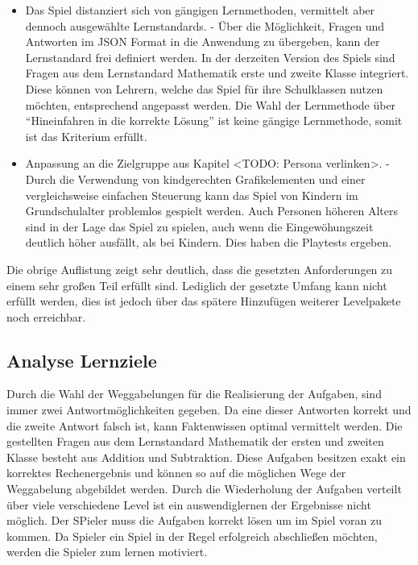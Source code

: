 \begin{itemize}
    \item{Das Spiel distanziert sich von gängigen Lernmethoden, vermittelt aber dennoch ausgewählte Lernstandards. - Über die Möglichkeit, Fragen und Antworten im JSON Format in die Anwendung zu übergeben, kann der Lernstandard frei definiert werden. In der derzeiten Version des Spiels sind Fragen aus dem Lernstandard Mathematik erste und zweite Klasse integriert. Diese können von Lehrern, welche das Spiel für ihre Schulklassen nutzen möchten, entsprechend angepasst werden. Die Wahl der Lernmethode über \enquote{Hineinfahren in die korrekte Lösung} ist keine gängige Lernmethode, somit ist das Kriterium erfüllt.}
    \item{Anpassung an die Zielgruppe aus Kapitel <TODO: Persona verlinken>. - Durch die Verwendung von kindgerechten Grafikelementen und einer vergleichsweise einfachen Steuerung kann das Spiel von Kindern im Grundschulalter problemlos gespielt werden. Auch Personen höheren Alters sind in der Lage das Spiel zu spielen, auch wenn die Eingewöhungszeit deutlich höher ausfällt, als bei Kindern. Dies haben die Playtests ergeben.}
\end{itemize}
Die obrige Auflistung zeigt sehr deutlich, dass die gesetzten Anforderungen zu einem sehr großen Teil erfüllt sind. Lediglich der gesetzte Umfang kann nicht erfüllt werden, dies ist jedoch über das spätere Hinzufügen weiterer Levelpakete noch erreichbar.

\subsection{Analyse Lernziele}
Durch die Wahl der Weggabelungen für die Realisierung der Aufgaben, sind immer zwei Antwortmöglichkeiten gegeben. Da eine dieser Antworten korrekt und die zweite Antwort falsch ist, kann Faktenwissen optimal vermittelt werden. Die gestellten Fragen aus dem Lernstandard Mathematik der ersten und zweiten Klasse besteht aus Addition und Subtraktion. Diese Aufgaben besitzen exakt ein korrektes Rechenergebnis und können so auf die möglichen Wege der Weggabelung abgebildet werden. Durch die Wiederholung der Aufgaben verteilt über viele verschiedene Level ist ein auswendiglernen der Ergebnisse nicht möglich. Der SPieler muss die Aufgaben korrekt lösen um im Spiel voran zu kommen. Da Spieler ein Spiel in der Regel erfolgreich abschließen möchten, werden die Spieler zum lernen motiviert.

